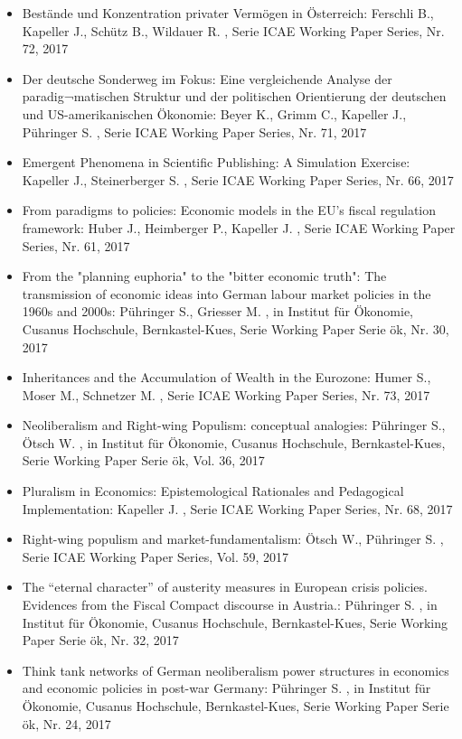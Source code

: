 \begin{itemize}
\item Bestände und Konzentration privater Vermögen in Österreich: Ferschli B., Kapeller J., Schütz B., Wildauer R. , Serie ICAE Working Paper Series, Nr. 72, 2017
\item Der deutsche Sonderweg im Fokus: Eine vergleichende Analyse der paradig¬matischen Struktur und der politischen Orientierung der deutschen und US-amerikanischen Ökonomie: Beyer K., Grimm C., Kapeller J., Pühringer S. , Serie ICAE Working Paper Series, Nr. 71, 2017
\item Emergent Phenomena in Scientific Publishing: A Simulation Exercise: Kapeller J., Steinerberger S. , Serie ICAE Working Paper Series, Nr. 66, 2017
\item From paradigms to policies: Economic models in the EU’s fiscal regulation framework: Huber J., Heimberger P., Kapeller J. , Serie ICAE Working Paper Series, Nr. 61, 2017
\item From the "planning euphoria" to the "bitter economic truth": The transmission of economic ideas into German labour market policies in the 1960s and 2000s: Pühringer S., Griesser M. , in Institut für Ökonomie, Cusanus Hochschule, Bernkastel-Kues, Serie Working Paper Serie ök, Nr. 30, 2017
\item Inheritances and the Accumulation of Wealth in the Eurozone: Humer S., Moser M., Schnetzer M. , Serie ICAE Working Paper Series, Nr. 73, 2017
\item Neoliberalism and Right-wing Populism: conceptual analogies: Pühringer S., Ötsch W. , in Institut für Ökonomie, Cusanus Hochschule, Bernkastel-Kues, Serie Working Paper Serie ök, Vol. 36, 2017
\item Pluralism in Economics: Epistemological Rationales and Pedagogical Implementation: Kapeller J. , Serie ICAE Working Paper Series, Nr. 68, 2017
\item Right-wing populism and market-fundamentalism: Ötsch W., Pühringer S. , Serie ICAE Working Paper Series, Vol. 59, 2017
\item The “eternal character” of austerity measures in European crisis policies. Evidences from the Fiscal Compact discourse in Austria.: Pühringer S. , in Institut für Ökonomie, Cusanus Hochschule, Bernkastel-Kues, Serie Working Paper Serie ök, Nr. 32, 2017
\item Think tank networks of German neoliberalism power structures in economics and economic policies in post-war Germany: Pühringer S. , in Institut für Ökonomie, Cusanus Hochschule, Bernkastel-Kues, Serie Working Paper Serie ök, Nr. 24, 2017

\end{itemize}

